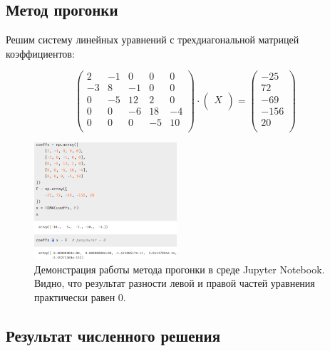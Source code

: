 \documentclass[a4paper]{article}
\begin{document}
\subsection{Метод прогонки}
Решим систему линейных уравнений с трехдиагональной матрицей коэффициентов:

\begin{equation}
\begin{pmatrix}
2 & -1 & 0 & 0 & 0 \\
-3 & 8 & -1 & 0 & 0 \\
0 & -5 & 12 & 2 & 0 \\
0 & 0 & -6 & 18 & -4 \\
0 & 0 & 0 & -5 & 10 \\
\end{pmatrix}
\cdot
\begin{pmatrix}
 X\\
\end{pmatrix}
=
\begin{pmatrix}
 -25 \\
 72 \\
 -69 \\
 -156 \\
 20 \\
\end{pmatrix}
\end{equation}

\begin{figure}[H]
\begin{center}
 \includegraphics[width=200px,keepaspectratio=true]{TDMA.png}
 
 \caption{Демонстрация работы метода прогонки в среде Jupyter Notebook. Видно, что результат разности левой и правой частей уравнения практически равен 0.}
\end{center}
\end{figure} 

\subsection{Результат численного решения}
\end{document}
